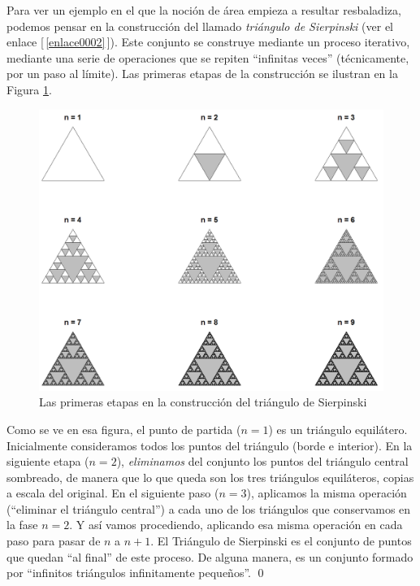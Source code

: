 \begin{ejemplo}
\label{cap03:ejem:TrianguloSierpinski}
Para ver un ejemplo en el que la noción de área empieza a resultar resbaladiza, podemos pensar en la construcción del llamado {\em triángulo de Sierpinski} (ver el enlace [\,\ref{enlace0002}\label{enlace0002a}\,]). Este conjunto se construye mediante un proceso iterativo, mediante una serie de operaciones que se repiten ``infinitas veces'' (técnicamente, por un paso al límite). Las primeras etapas de la construcción se ilustran en la Figura \ref{Cap03:fig:TrianguloSierpinski}.
\begin{figure}[b!]
\begin{center}
\includegraphics[width=14cm]{../fig/Cap03-SierpinskiConR.png}
\caption{Las primeras etapas en la construcción del triángulo de Sierpinski}
\label{Cap03:fig:TrianguloSierpinski}
\end{center}
\end{figure}
Como se ve en esa figura, el punto de partida ($n=1$) es un triángulo equilátero. Inicialmente consideramos todos los puntos del triángulo (borde e interior). En la siguiente etapa ($n=2$), {\em eliminamos} del conjunto los puntos del triángulo central sombreado, de manera que lo que queda son los tres triángulos equiláteros, copias a escala del original. En el siguiente paso ($n=3$), aplicamos la misma operación (``eliminar el triángulo central'') a cada uno de los triángulos que conservamos en la fase $n=2$. Y así vamos procediendo, aplicando esa misma operación en cada paso para pasar de $n$ a $n+1$. El Triángulo de Sierpinski es el conjunto de puntos que quedan ``al final'' de este proceso. De alguna manera, es un conjunto formado por ``infinitos triángulos infinitamente pequeños''.
\qed
\end{ejemplo}

